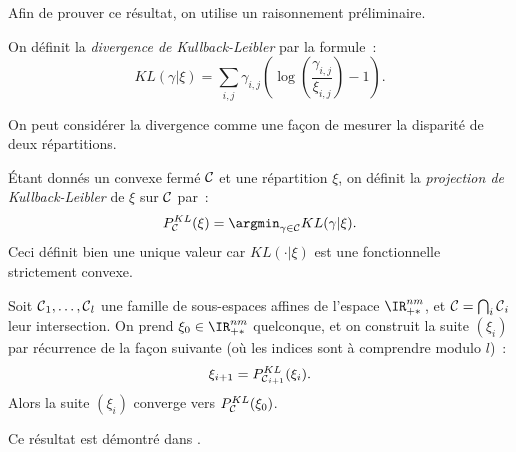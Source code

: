 Afin de prouver ce résultat, on utilise un raisonnement préliminaire.
\begin{definition}
On définit la \emph{divergence de Kullback-Leibler} par la formule~:
\begin{equation}\label{eq:kl}
KL(\gamma | \xi) = \sum_{i,j} \gamma_{i,j} \left(\log\left(\frac{\gamma_{i,j}}{\xi_{i,j}} \right) -1 \right) .
\end{equation}
\end{definition}
On peut considérer la divergence comme une façon de mesurer la disparité de deux répartitions.
\begin{definition}
 \'Etant donnés un convexe fermé $\operatorname{\mathcal{C}}$ et une répartition $\xi$, on définit la \emph{projection de Kullback-Leibler} de $\xi$ sur $\operatorname{\mathcal{C}}$ par~:
\begin{equation}\label{eq:pkl}
P^{KL}_{\Ccal} (\xi) = \argmin_{\gamma \in \Ccal} KL(\gamma | \xi) .
\end{equation}
Ceci définit bien une unique valeur car $KL(\cdot | \xi)$ est une fonctionnelle strictement convexe.
\end{definition}


\begin{lemma}\label{lemma:bregman}
Soit $\operatorname{\mathcal{C}}_1, \ldots, \operatorname{\mathcal{C}}_l$ une famille de sous-espaces affines de l'espace $\IR_{+*}^{nm}$, et $\operatorname{\mathcal{C}} = \bigcap_i \operatorname{\mathcal{C}}_i$ leur intersection. On prend $\xi_0 \in \IR_{+*}^{nm}$ quelconque, et on construit la suite $(\xi_i)$ par récurrence de la façon suivante (où les indices sont à comprendre modulo $l$)~:
\[
\xi_{i+1} = P^{KL}_{\operatorname{\mathcal{C}}_{i+1}}(\xi_i) .
\]
Alors la suite $(\xi_i)$ converge vers $P^{KL}_{\operatorname{\mathcal{C}}} (\xi_0)$. 
\end{lemma}
Ce résultat est démontré dans \cite{bregman66}.

